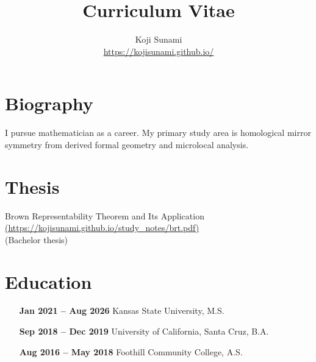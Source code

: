 \documentclass{article}
\begin{document}
\title{\bf Curriculum Vitae}
\author{Koji Sunami\\
\href{https://kojisunami.github.io/}{https://kojisunami.github.io/}}
\maketitle


\section*{Biography}
I pursue mathematician as a career. My primary study area is homological mirror symmetry from derived formal geometry and microlocal analysis.

\section*{Thesis}
Brown Representability Theorem and Its Application
\href{https://kojisunami.github.io/study_notes/brt.pdf}{(https://kojisunami.github.io/study\_notes/brt.pdf)} \\
(Bachelor thesis)


\section*{Education}
\begin{itemize}[
    labelwidth=3cm,
    labelsep=5mm,
    leftmargin=!,
    align=left ]
\item[\bfseries{Jan 2021 -- Aug 2026}] Kansas State University, M.S.
\item[\bfseries{Sep 2018 -- Dec 2019}] University of California, Santa Cruz, B.A.
\item[\bfseries{Aug 2016 -- May 2018}] Foothill Community College, A.S. 
\end{itemize}
\end{document}

